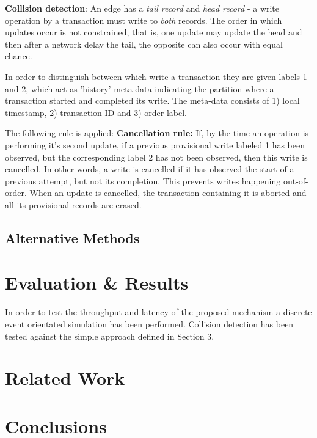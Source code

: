 \documentclass[sigplan,screen]{acmart}
\begin{document}
\textbf{Collision detection}: An edge has a \textit{tail record} and \textit{head record} - a write operation by a transaction must write to \textit{both} records. The order in which updates occur is not constrained, that is, one update may update the head and then after a network delay the tail, the opposite can also occur with equal chance.

In order to distinguish between which write a transaction they are given labels 1 and 2, which act as 'history' meta-data indicating the partition where a transaction started and completed its write. The meta-data consists of 1) local timestamp, 2) transaction ID and 3) order label.

The following rule is applied: \textbf{Cancellation rule:} If, by the time an operation is performing it's second update, if a previous provisional write labeled 1 has been observed, but the corresponding label 2 has not been observed, then this write is cancelled. In other words, a write is cancelled if it has observed the start of a previous attempt, but not its completion. This prevents writes happening out-of-order. When an update is cancelled, the transaction containing it is aborted and all its provisional records are erased.

\subsection{Alternative Methods}

\section{Evaluation \& Results}

In order to test the throughput and latency of the proposed mechanism a discrete event orientated simulation has been performed. Collision detection has been tested against the simple approach defined in Section 3.

\section{Related Work}

\section{Conclusions}


\end{document}
